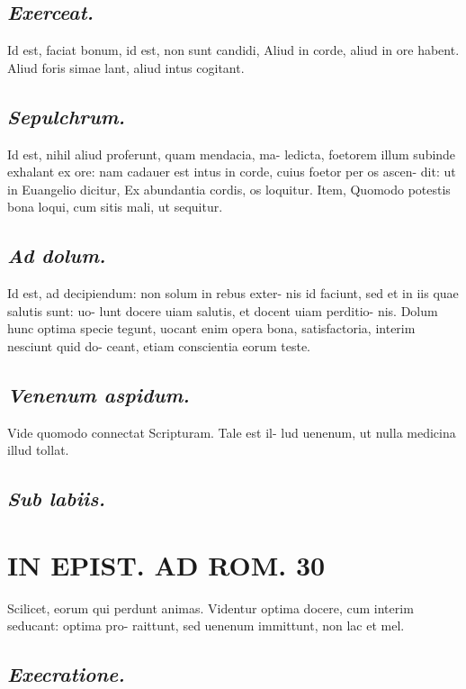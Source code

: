 \documentclass{article}
\begin{document}
\begin{pages}
\subsection*{\textit{Exerceat. }}\pstart Id est, faciat bonum, id est, non sunt candidi, Aliud in corde, aliud in ore habent. Aliud foris simae lant, aliud intus cogitant.   \pend
{}
{}
\subsection*{\textit{Sepulchrum. }}\pstart Id est, nihil aliud proferunt, quam mendacia, ma- ledicta, foetorem illum subinde exhalant ex ore: nam cadauer est intus in corde, cuius foetor per os ascen- dit: ut in Euangelio dicitur, Ex abundantia cordis, os loquitur. Item, Quomodo potestis bona loqui, cum sitis mali, ut sequitur.   \pend
{}
{}
\subsection*{\textit{Ad dolum. }}\pstart Id est, ad decipiendum: non solum in rebus exter- nis id faciunt, sed et in iis quae salutis sunt: uo- lunt docere uiam salutis, et docent uiam perditio- nis. Dolum hunc optima specie tegunt, uocant enim opera bona, satisfactoria, interim nesciunt quid do- ceant, etiam conscientia eorum teste.   \pend
{}
{}
\subsection*{\textit{Venenum aspidum. }}\pstart Vide quomodo connectat Scripturam. Tale est il- lud uenenum, ut nulla medicina illud tollat.   \pend
{}
{}
\subsection*{\textit{Sub labiis. }}
\section*{IN EPIST. AD ROM.  30 }
\marginpar{[ p.]}\pstart Scilicet, eorum qui perdunt animas. Videntur optima docere, cum interim seducant: optima pro- raittunt, sed uenenum immittunt, non lac et mel.   \pend
{}
{}
\subsection*{\textit{Execratione. }}
{}

\end{pages}
\end{document}
